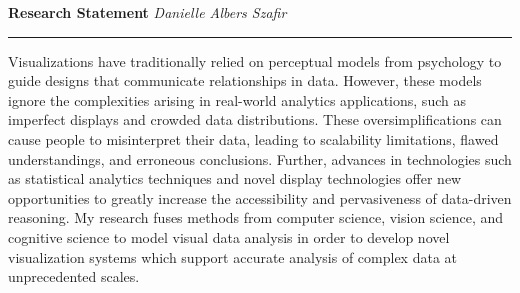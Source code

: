 \documentclass[11pt]{article}
\begin{document}
\setlength{\belowcaptionskip}{-10pt}

\thispagestyle{fancy}

\textbf{\Large Research Statement}
{\hspace{220pt}\emph{Danielle Albers Szafir} \vspace{3pt}}
\hrule


Visualizations have traditionally relied on perceptual models from psychology to guide designs that communicate relationships in data.  However, these models ignore the complexities arising in real-world analytics applications, such as imperfect displays and crowded data distributions. These oversimplifications can cause people to misinterpret their data, leading to scalability limitations, flawed understandings, and erroneous conclusions. Further, advances in technologies such as statistical analytics techniques and novel display technologies offer new opportunities 
to greatly increase the accessibility and pervasiveness of data-driven reasoning. My research fuses methods from computer science, vision science, and cognitive science to model visual data analysis in order to develop novel visualization systems which support accurate analysis of complex data at unprecedented scales.
\end{document}
